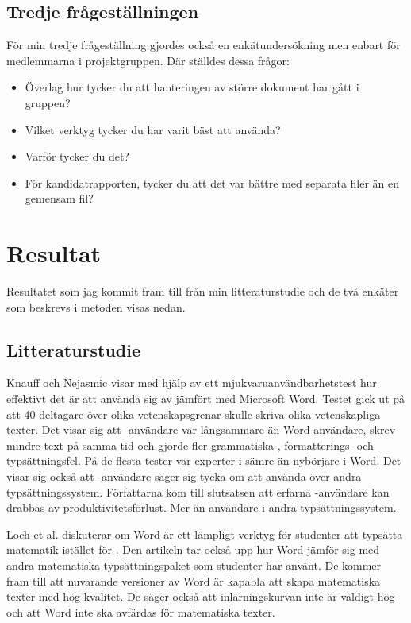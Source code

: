 \subsection{Tredje frågeställningen}

För min tredje frågeställning gjordes också en enkätundersökning men enbart för medlemmarna i projektgruppen. Där ställdes dessa frågor:
\begin{itemize}
	\item Överlag hur tycker du att hanteringen av större dokument har gått i gruppen?
	\item Vilket verktyg tycker du har varit bäst att använda?
	\item Varför tycker du det?
	\item För kandidatrapporten, tycker du att det var bättre med separata filer än en gemensam fil?
\end{itemize}

\section{Resultat}
\label{sec:results-tuhkala}
Resultatet som jag kommit fram till från min litteraturstudie och de två enkäter som beskrevs i metoden visas nedan.

\subsection{Litteraturstudie}
Knauff och Nejasmic \cite{knauff2014efficiency} visar med hjälp av ett mjukvaruanvändbarhetstest hur effektivt det är att använda sig av \latex jämfört med Microsoft Word. Testet gick ut på att 40 deltagare över olika vetenskapsgrenar skulle skriva olika vetenskapliga texter.
Det visar sig att \latex-användare var långsammare än Word-användare, skrev mindre text på samma tid och gjorde fler grammatiska-, formatterings- och typsättningsfel. På de flesta tester var experter i \latex sämre än nybörjare i Word. Det visar sig också att \latex-användare säger sig tycka om att använda \latex över andra typsättningssystem. Författarna kom till slutsatsen att erfarna \latex-användare kan drabbas av produktivitetsförlust. Mer än användare i andra typsättningssystem.

Loch et al. \cite{loch2014master} diskuterar om Word är ett lämpligt verktyg för studenter att typsätta matematik istället för \latex. Den artikeln tar också upp hur Word jämför sig med andra matematiska typsättningspaket som studenter har använt. De kommer fram till att nuvarande versioner av Word är kapabla att skapa matematiska texter med hög kvalitet. De säger också att inlärningskurvan inte är väldigt hög och att Word inte ska avfärdas för matematiska texter.  


